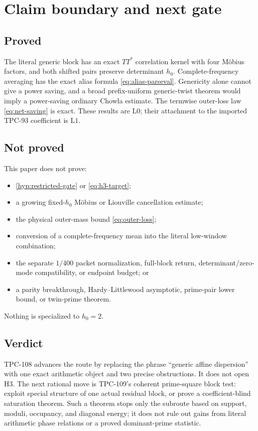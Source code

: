\documentclass[11pt]{article}
\theoremstyle{definition}
\theoremstyle{remark}
\newcommand{\Lzero}{\mathrm{L0}}
\newcommand{\Lone}{\mathrm{L1}}
\begin{document}
\section{Claim boundary and next gate}

\subsection*{Proved}

The literal generic block has an exact \(TT^*\) correlation kernel
with four M\"obius factors, and both shifted pairs preserve
determinant \(h_0\).  Complete-frequency averaging has the exact
alias formula \eqref{eq:alias-parseval}.  Genericity alone cannot
give a power saving, and a broad prefix-uniform generic-twist theorem
would imply a power-saving ordinary Chowla estimate.  The termwise
outer-loss law \eqref{eq:net-saving} is exact.  These results are
\(\Lzero\); their attachment to the imported TPC-93 coefficient is
\(\Lone\).

\subsection*{Not proved}

This paper does not prove:
\begin{itemize}[leftmargin=2em]
\item \cref{hyp:restricted-gate} or
\eqref{eq:h3-target};
\item a growing fixed-\(h_0\) M\"obius or Liouville cancellation
estimate;
\item the physical outer-mass bound \eqref{eq:outer-loss};
\item conversion of a complete-frequency mean into the literal
low-window combination;
\item the separate \(1/400\) packet normalization, full-block
return, determinant/zero-mode compatibility, or endpoint budget;
or
\item a parity breakthrough, Hardy--Littlewood asymptotic,
prime-pair lower bound, or twin-prime theorem.
\end{itemize}
Nothing is specialized to \(h_0=2\).

\subsection*{Verdict}

TPC-108 advances the route by replacing the phrase ``generic affine
dispersion'' with one exact arithmetic object and two precise
obstructions.  It does not open H3.  The next rational move is
TPC-109's coherent prime-square block test: exploit special
structure of one actual residual block, or prove a
coefficient-blind saturation theorem.  Such a theorem stops only
the subroute based on support, moduli, occupancy, and diagonal
energy; it does not rule out gains from literal arithmetic phase
relations or a proved dominant-prime statistic.

\begingroup
\footnotesize
\raggedright


\endgroup
\end{document}
